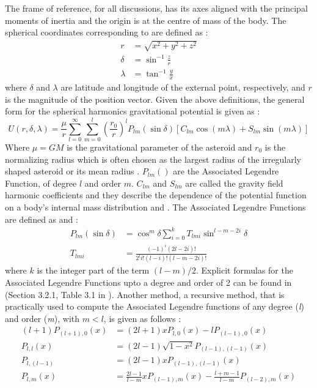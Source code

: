 The frame of reference, for all discussions, has its axes aligned with the principal moments of inertia and the origin is at the centre of mass of the body. The spherical coordinates corresponding to  are defined as \cite{danbook}:
\begin{align}
\label{magn}
r &= \sqrt{x^2 + y^2 + z^2} \\
\label{lat}
\delta &= \sin^{-1}\frac{z}{r} \\
\label{long}
\lambda &= \tan^{-1}\frac{y}{x}
\end{align}
%
where $\delta$ and $\lambda$ are latitude and longitude of the external point, respectively, and $r$ is the magnitude of the position vector. Given the above definitions, the general form for the spherical harmonics gravitational potential is given as \cite{danbook}:
\begin{equation}
\label{sph_harm}
U(r, \delta, \lambda) = \frac{\mu}{r}\sum_{l=0}^{\infty}\sum_{m=0}^{l}\left(\frac{r_0}{r}\right)^lP_{lm}(\sin\delta)[C_{lm}\cos(m\lambda) + S_{lm}\sin(m\lambda)]
\end{equation}
%
Where $\mu = GM$ is the gravitational parameter of the asteroid and $r_0$ is the normalizing radius which is often chosen as the largest radius of the irregularly shaped asteroid or its mean radius  \cite{danbook}. $P_{lm}()$ are the Associated Legendre Function, of degree $l$ and order $m$. $C_{lm}$ and $S_{lm}$ are called the gravity field harmonic coefficients and they describe the dependence of the potential function on a body's internal mass distribution \cite{gillbook} and \cite{danbook}. The Associated Legendre Functions are defined as \cite{kaulabook} and \cite{danbook}:
\begin{align}
\label{legendre}
P_{lm}(\sin\delta) &= \cos^m\delta\sum_{i=0}^{k}T_{lmi}\sin^{l-m-2i}\delta \\
\label{legen_tfunc}
T_{lmi} &= \frac{(-1)^i(2l - 2i)!}{2^li!(l-i)!(l-m-2i)!}
\end{align}
%
where $k$ is the integer part of the term $(l-m)/2$. Explicit formulas for the Associated Legendre Functions upto a degree and order of 2 can be found in \cite{gillbook} (Section 3.2.1, Table 3.1 in \cite{gillbook}). Another method, a recursive method, that is practically used to compute the Associated Legendre functions of any degree (\textit{l}) and order (\textit{m}), with $m<l$, is given as follows \cite{wakker}:
\begin{align}
\label{legendre_zonal_harmonics}
(l+1) P_{(l+1),0}(x) &= (2l+1) x P_{l,0}(x) - l P_{(l-1),0}(x) \\
\label{legendre_sectorial_harmonics}
P_{l,l}(x) &= (2l-1) \sqrt{1-x^2} P_{(l-1),(l-1)}(x) \\
\label{legendre_tesseral_harmonics_1}
P_{l,(l-1)} &= (2l-1) x P_{(l-1),(l-1)}(x) \\
\label{legendre_tesseral_harmonics_2}
P_{l,m}(x) &= \frac{2l-1}{l-m} x P_{(l-1),m}(x) - \frac{l+m-1}{l-m} P_{(l-2),m}(x)
\end{align}
